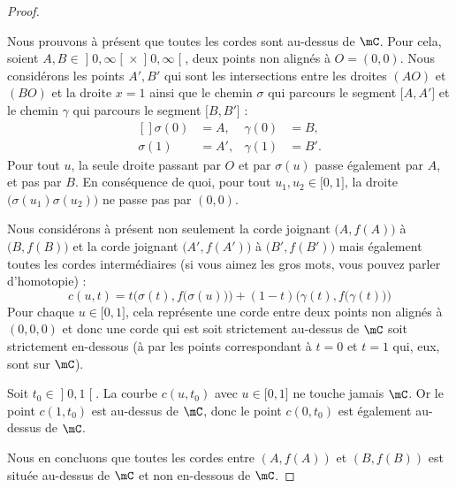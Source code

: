 \begin{proof}
\begin{subproof}
    \end{subproof}

    Nous prouvons à présent que toutes les cordes sont au-dessus de \( \mC\). Pour cela, soient \( A,B\in \mathopen] 0 , \infty \mathclose[\times \mathopen] 0 , \infty \mathclose[\), deux points non alignés à \( O=(0,0)\). Nous considérons les points \( A',B'\) qui sont les intersections entre les droites \( (AO)\) et \( (BO)\) et la droite \( x=1\) ainsi que le chemin \( \sigma\) qui parcours le segment \( \mathopen[ A , A' \mathclose]\) et le chemin \( \gamma\) qui parcours le segment \( \mathopen[ B , B' \mathclose]\) :
    \begin{equation}
        \begin{aligned}[]
            \sigma(0) & =A,   &\gamma(0)  &=B,    \\
            \sigma(1) & =A',  &\gamma(1)  &=B'.
        \end{aligned}
    \end{equation}
    Pour tout \( u\), la seule droite passant par \( O\) et par \( \sigma(u)\) passe également par \( A\), et pas par \( B\). En conséquence de quoi, pour tout \( u_1,u_2\in \mathopen[ 0 , 1 \mathclose]\), la droite \( \big( \sigma(u_1)\sigma(u_2) \big)\) ne passe pas par \( (0,0)\).

    Nous considérons à présent non seulement la corde joignant \( \big( A,f(A) \big)\) à \( \big( B,f(B) \big)\) et la corde joignant \( \big( A',f(A') \big)\) à \( \big( B',f(B') \big)\) mais également toutes les cordes intermédiaires (si vous aimez les gros mots, vous pouvez parler d'homotopie) :
    \begin{equation}
        c(u,t)=t\Big( \sigma(t), f\big(\sigma(u)\big) \Big)+(1-t)\Big( \gamma(t),f\big( \gamma(t) \big) \Big)
    \end{equation}
    Pour chaque \( u\in\mathopen[ 0 , 1 \mathclose]\), cela représente une corde entre deux points non alignés à \( (0,0,0)\) et donc une corde qui est soit strictement au-dessus de \( \mC\) soit strictement en-dessous (à par les points correspondant à \( t=0\) et \( t=1\) qui, eux, sont sur \( \mC\)).

    Soit \( t_0\in \mathopen] 0 , 1 \mathclose[\). La courbe \( c(u,t_0)\) avec \( u\in\mathopen[ 0 , 1 \mathclose]\) ne touche jamais \( \mC\). Or le point \( c(1,t_0)\) est au-dessus de \( \mC\), donc le point \( c(0,t_0)\) est également au-dessus de \( \mC\).

    Nous en concluons que toutes les cordes entre \( (A,f(A)) \) et \( (B,f(B))\) est située au-dessus de \( \mC\) et non en-dessous de \( \mC\).
\end{proof}

